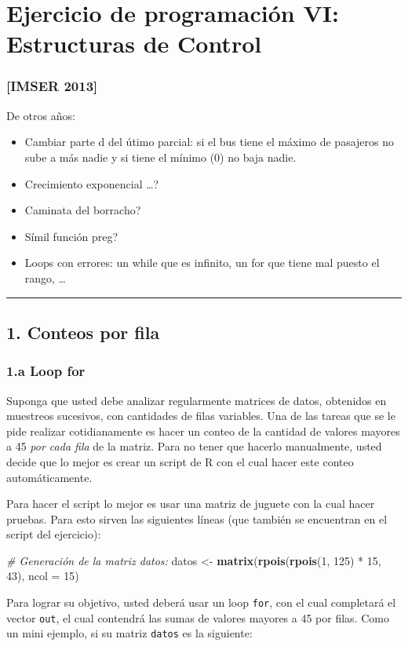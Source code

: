 \documentclass[]{article}
\newenvironment{Shaded}{}{}
\newcommand{\KeywordTok}[1]{\textcolor[rgb]{0.00,0.44,0.13}{\textbf{{#1}}}}
\newcommand{\DataTypeTok}[1]{\textcolor[rgb]{0.56,0.13,0.00}{{#1}}}
\newcommand{\DecValTok}[1]{\textcolor[rgb]{0.25,0.63,0.44}{{#1}}}
\newcommand{\CommentTok}[1]{\textcolor[rgb]{0.38,0.63,0.69}{\textit{{#1}}}}
\newcommand{\NormalTok}[1]{{#1}}
\begin{document}
\section{Ejercicio de programación VI: Estructuras de Control}

\subsubsection{{[}IMSER 2013{]}}

De otros años:

\begin{itemize}
\item
  Cambiar parte d del útimo parcial: si el bus tiene el máximo de
  pasajeros no sube a más nadie y si tiene el mínimo (0) no baja nadie.
\item
  Crecimiento exponencial \ldots{}?
\item
  Caminata del borracho?
\item
  Símil función preg?
\item
  Loops con errores: un while que es infinito, un for que tiene mal
  puesto el rango, \ldots{}
\end{itemize}
\begin{center}\rule{3in}{0.4pt}\end{center}

\subsection{1. Conteos por fila}

\subsubsection{1.a Loop for}

Suponga que usted debe analizar regularmente matrices de datos,
obtenidos en muestreos sucesivos, con cantidades de filas variables. Una
de las tareas que se le pide realizar cotidianamente es hacer un conteo
de la cantidad de valores mayores a 45 \emph{por cada fila} de la
matriz. Para no tener que hacerlo manualmente, usted decide que lo mejor
es crear un script de R con el cual hacer este conteo automáticamente.

Para hacer el script lo mejor es usar una matriz de juguete con la cual
hacer pruebas. Para esto sirven las siguientes líneas (que también se
encuentran en el script del ejercicio):

\begin{Shaded}
\begin{Highlighting}[]
\CommentTok{# Generación de la matriz datos:}
\NormalTok{datos <- }\KeywordTok{matrix}\NormalTok{(}\KeywordTok{rpois}\NormalTok{(}\KeywordTok{rpois}\NormalTok{(}\DecValTok{1}\NormalTok{, }\DecValTok{125}\NormalTok{) * }\DecValTok{15}\NormalTok{, }\DecValTok{43}\NormalTok{), }\DataTypeTok{ncol =} \DecValTok{15}\NormalTok{)}
\end{Highlighting}
\end{Shaded}
Para lograr su objetivo, usted deberá usar un loop \texttt{for}, con el
cual completará el vector \texttt{out}, el cual contendrá las sumas de
valores mayores a 45 por filas. Como un mini ejemplo, si su matriz
\texttt{datos} es la siguiente:
\end{document}
